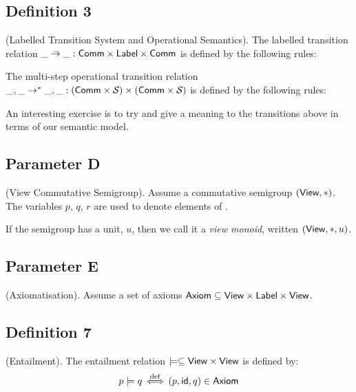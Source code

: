 \subsection{Definition 3}
(Labelled Transition System and Operational Semantics).
The labelled transition relation
$\_ \stackrel{\_}{\rightarrow} \_ : \mathsf{Comm} \times \mathsf{Label} \times \mathsf{Comm}$
is defined by the following rules:
The multi-step operational transition relation
$\_,\_ \rightarrow^* \_,\_ : (\mathsf{Comm}\times\mathcal{S}_{\mathsf{}}) \times (\mathsf{Comm}\times\mathcal{S}_{\mathsf{}})$
is defined by the following rules:

An interesting exercise is to try and give a meaning
to the transitions above in terms of our semantic model.

\subsection{Parameter D} (View Commutative Semigroup).
Assume a commutative
semigroup $(\mathsf{View},*)$. The variables $p$, $q$, $r$ are used to denote
elements of \View.

If the semigroup has a unit, $u$, then we call it a \emph{view monoid},
written $(\mathsf{View},*,u)$.

\subsection{Parameter E} (Axiomatisation).
Assume a set of axioms $\mathsf{Axiom} \subseteq \mathsf{View} \times \mathsf{Label} \times \mathsf{View}$.

\subsection{Definition 7}
(Entailment).
The entailment relation
$\models \subseteq \mathsf{View} \times \mathsf{View}$
is defined by:
\[
  p\models q \mathrel{\stackrel{\mathrm{def}}{\,\Leftarrow\!\Rightarrow\,}} (p,\mathsf{id},q) \in \mathsf{Axiom}
\]

